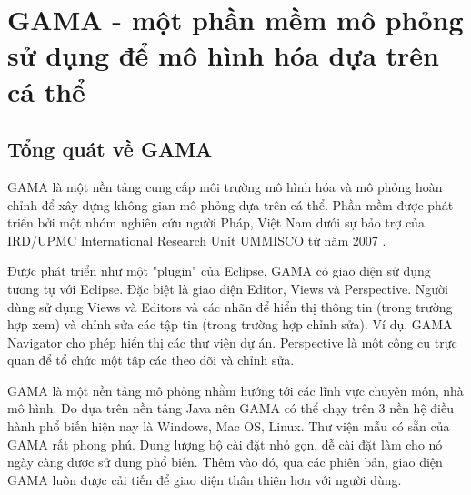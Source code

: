 \documentclass[13pt]{extreport}
\begin{document}
\section{GAMA - một phần mềm mô phỏng sử dụng để mô hình hóa dựa trên cá thể}

\subsection{Tổng quát về GAMA}
\indent GAMA là một nền tảng cung cấp môi trường mô hình hóa và mô phỏng hoàn chỉnh để xây dựng không gian mô phỏng dựa trên cá thể. Phần mềm được phát triển bởi một nhóm nghiên cứu người Pháp, Việt Nam dưới sự bảo trợ của IRD/UPMC International Research Unit UMMISCO từ năm 2007 \cite{tltk11}.

Được phát triển như một "plugin" của Eclipse, GAMA có giao diện sử dụng tương tự với Eclipse. Đặc biệt là giao diện Editor, Views và Perspective. Người dùng sử dụng Views và Editors và các nhãn để hiển thị thông tin (trong trường hợp xem) và chỉnh sửa các tập tin (trong trường hợp chỉnh sửa). Ví dụ, GAMA Navigator cho phép hiển thị các thư viện dự án. Perspective là một công cụ trực quan để tổ chức một tập các theo dõi và chỉnh sửa.

GAMA là một nền tảng mô phỏng nhằm hướng tới các lĩnh vực chuyên môn, nhà mô hình. Do dựa trên nền tảng Java nên GAMA có thể chạy trên 3 nền hệ điều hành phổ biến hiện nay là Windows, Mac OS, Linux. Thư viện mẫu có sẵn của GAMA rất phong phú. Dung lượng bộ cài đặt nhỏ gọn, dễ cài đặt làm cho nó ngày càng được sử dụng phổ biến. Thêm vào đó, qua các phiên bản, giao diện GAMA luôn được cải tiến để giao diện thân thiện hơn với người dùng. 
\end{document}
